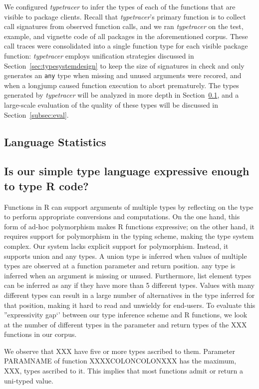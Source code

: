 \documentclass[acmsmall,review,anonymous]{acmart}\settopmatter{printfolios=true,printccs=false,printacmref=false}
\newcommand{\code}[1]{{\lstinline[style=Rin]!#1!}\xspace}
\newcommand{\typetracer}{\emph{typetracer}\xspace} %
\begin{document}
We configured \typetracer to infer the types of each of the functions that are visible to package clients.
Recall that \typetracer's primary function is to collect call signatures from observed function calls, and we ran \typetracer on the test, example, and vignette code of all packages in the aforementioned corpus.
These call traces were consolidated into a single function type for each visible package function:
\typetracer employs unification strategies discussed in Section~\ref{sec:typesystemdesign} to keep the size of signatures in check and only generates an \code{any} type when missing and unused arguments were recored, and when a longjump caused function execution to abort prematurely.
The types generated by \typetracer will be analyzed in more depth in Section~\ref{subsec:stats}, and a large-scale evaluation of the quality of these types will be discussed in Section~\ref{subsec:eval}.

%
%
%
%
\subsection{Language Statistics}
\label{subsec:stats}

\subsection{Is our simple type language expressive enough to type R code?} Functions in
R can support arguments of multiple types by reflecting on the type to perform
appropriate conversions and computations. On the one hand, this form of ad-hoc
polymorphism makes R functions expressive; on the other hand, it requires
support for polymorphism in the typing scheme, making the type system complex. 
Our system lacks explicit support for polymorphism. Instead, it supports union and any
types. A union type is inferred when values of multiple types are observed at a
function parameter and return position. any type is inferred when an argument is
missing or unused. Furthermore, list element types can be inferred as any if
they have more than 5 different types. Values with many different types can
result in a large number of alternatives in the type inferred for that position,
making it hard to read and unwieldy for end-users. To evaluate this
''expressivity gap`' between our type inference scheme and R functions,
we look at the number of different types in the parameter and return types of
the XXX functions in our corpus.

We observe that XXX%
have five or more types ascribed to them. Parameter PARAMNAME of function
XXXXCOLONCOLONXXX has the maximum, XXX, types ascribed to it. This implies that
most functions admit or return a uni-typed value.
\end{document}
